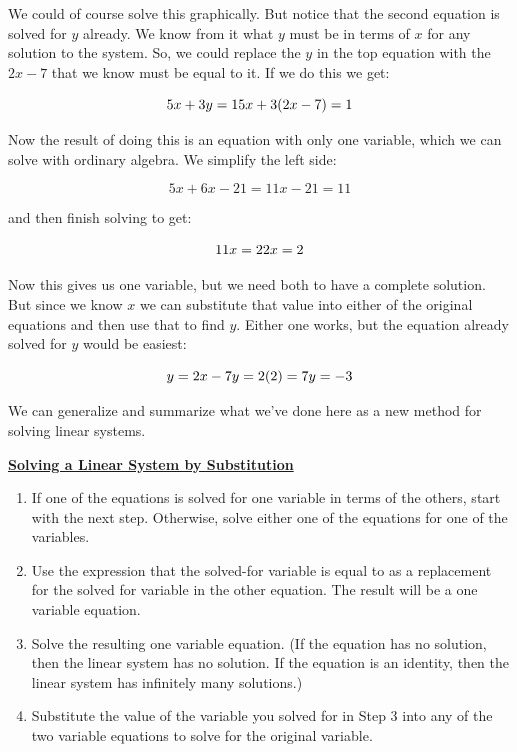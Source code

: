 We could of course solve this graphically. But notice that the second equation is solved for $y$ already. We know from it what $y$ must be in terms of $x$ for any solution to the system. So, we could replace the $y$ in the top equation with the $2x-7$ that we know must be equal to it. If we do this we get:

$$5x+3y=1\\5x+3(2x-7)=1$$

Now the result of doing this is an equation with only one variable, which we can solve with ordinary algebra. We simplify the left side:

$$5x+6x-21=11x-21=11$$

and then finish solving to get:

$$11x=22\\x=2$$

Now this gives us one variable, but we need both to have a complete solution. But since we know $x$ we can substitute that value into either of the original equations and then use that to find $y$. Either one works, but the equation already solved for $y$ would be easiest:

$$y=2x-7\\y=2(2)=7\\y=-3$$

We can generalize and summarize what we’ve done here as a new method for solving linear systems.

\begin{definition}
	\textbf{\underline{Solving a Linear System by Substitution}}\\
	\bigskip
	\begin{enumerate}
		\item If one of the equations is solved for one variable in terms of the others, start with the next step. Otherwise, solve either one of the equations for one of the variables.
		\item Use the expression that the solved-for variable is equal to as a replacement for the solved for variable in the other equation. The result will be a one variable equation.
		\item Solve the resulting one variable equation. (If the equation has no solution, then the linear system has no solution. If the equation is an identity, then the linear system has infinitely many solutions.)
		\item Substitute the value of the variable you solved for in Step 3 into any of the two variable equations to solve for the original variable.
	\end{enumerate}
\end{definition}


